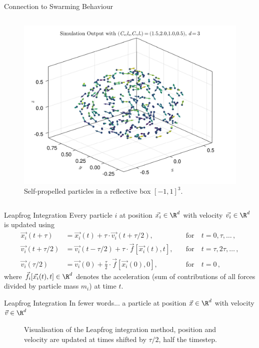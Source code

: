 \documentclass[aspectratio=169, hyperref={colorlinks=true}]{beamer}
\begin{document}
\begin{frame}{Connection to Swarming Behaviour}
\begin{columns}
\begin{column}{0.4\textwidth}
\begin{figure}[H]
          \includegraphics[width=\linewidth]{results/morse-3d/simulation-quiver-3d.pdf}
          \caption[Self-propelled particles in 3D interacting through $K_{C_a, l_a, C_r, l_r}(r)$]{Self-propelled particles in a reflective box $[-1, 1]^3$.}
          \label{fig:morse-3d-quiver}
        \end{figure}
      \end{column}
    \end{columns}
  \end{frame}

  \begin{frame}{Leapfrog Integration}
    Every particle $i$ at position $\vec{x_i} \in \R^d$ with velocity $\vec{v_i} \in \R^d$ is updated using
    \begin{align*}
      \vec{x_i}(t+\tau)     & = \vec{x_i}(t)+\tau \cdot \vec{v_i}(t+\tau / 2),              & \quad\text{for}~ & t=0, \tau, \ldots\,,      \\
      \vec{v_i}(t+\tau / 2) & = \vec{v_i}(t-\tau/2) + \tau \cdot \vec{f}[\vec{x_i}(t), t],  & \quad\text{for}~ & t=\tau, 2 \tau, \ldots\,, \\
      \vec{v_i}(\tau / 2)   & = \vec{v_i}(0)+\frac{\tau}{2} \cdot \vec{f}[\vec{x_i}(0), 0], & \quad\text{for}~ & t=0\,,
    \end{align*}
    where $\vec{f_i}[\vec{x_i}(t), t] \in \R^d$ denotes the acceleration (sum of contributions of all forces divided by particle mass $m_i$) at time $t$.
  \end{frame}

  \begin{frame}{Leapfrog Integration}
    In fewer words... a particle at position $\vec{x} \in \R^d$ with velocity $\vec{v} \in \R^d$
    \begin{figure}[H]
      \centering
      \caption[Leapfrog Visualisation]{Visualisation of the Leapfrog integration method, position and velocity are updated at times shifted by $\tau/2$, half the timestep.}
      \label{fig:leapfrog}
    \end{figure}
  \end{frame}
\end{document}
